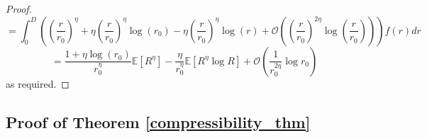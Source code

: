\documentclass{article}
\newcommand{\bigO}[1]{\mathcal{O}\left(#1\right)}
\begin{document}
\begin{proof}
\begin{equation}
    \end{equation}
    \begin{equation}
        = \int_0^D \left(\left(\frac{r}{r_0}\right)^{\eta} + \eta\left(\frac{r}{r_0}\right)^{\eta}\log(r_0) - \eta\left(\frac{r}{r_0}\right)^{\eta}\log(r) + \bigO{\left(\frac{r}{r_0}\right)^{2\eta}\log \left(\frac{r}{r_0}\right)}\right) f(r)dr
    \end{equation}
    \begin{equation}
        = \frac{1+\eta\log(r_0)}{r_0^{\eta}}\mathbb{E}[R^{\eta}] - \frac{\eta}{r_0^{\eta}}\mathbb{E}[R^\eta \log R] + \bigO{\frac{1}{r_0^{2\eta}}\log r_0}
    \end{equation}
    as required.
\end{proof}

\subsection{Proof of Theorem \ref{compressibility_thm}}
\end{document}
